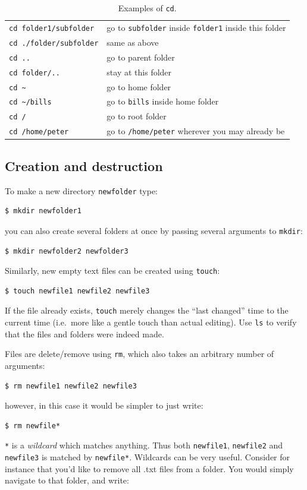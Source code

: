 \begin{table}
	\centering
	\caption{Examples of \texttt{cd}.}
	\begin{tabular}{ll}
	\hline
	\verb|cd folder1/subfolder|	&	go to \verb|subfolder| inside \verb|folder1| inside this folder	\\
	\verb|cd ./folder/subfolder|	&	same as above		\\
	\verb|cd ..|					&	go to parent folder	\\
	\verb|cd folder/..|			&	stay at this folder	\\
	\verb|cd ~|					&	go to home folder 	\\
	\verb|cd ~/bills|			&	go to \verb|bills| inside home folder \\
	\verb|cd /|					&	go to root folder	\\
	\verb|cd /home/peter|		&	go to \verb|/home/peter| wherever you may already be
	\end{tabular}
	\label{tab:bash:cd}
\end{table}

\subsection{Creation and destruction}
To make a new directory \verb|newfolder| type:

\begin{verbatim}
$ mkdir newfolder1
\end{verbatim}
you can also create several folders at once by passing several arguments to \verb|mkdir|:

\begin{verbatim}
$ mkdir newfolder2 newfolder3
\end{verbatim}
Similarly, new empty text files can be created using \verb|touch|:

\begin{verbatim}
$ touch newfile1 newfile2 newfile3
\end{verbatim}
If the file already exists, \verb|touch| merely changes the ``last changed'' time to the current time (i.e.\ more like a gentle touch than actual editing). Use \verb|ls| to verify that the files and folders were indeed made.

Files are delete/remove using \verb|rm|, which also takes an arbitrary number of arguments:
\begin{verbatim}
$ rm newfile1 newfile2 newfile3
\end{verbatim}
however, in this case it would be simpler to just write:
\begin{verbatim}
$ rm newfile*
\end{verbatim}
\verb|*| is a \emph{wildcard} which matches anything. Thus both \verb|newfile1|, \verb|newfile2| and \verb|newfile3| is matched by \verb|newfile*|. Wildcards can be very useful. Consider for instance that you'd like to remove all .txt files from a folder. You would simply navigate to that folder, and write:

